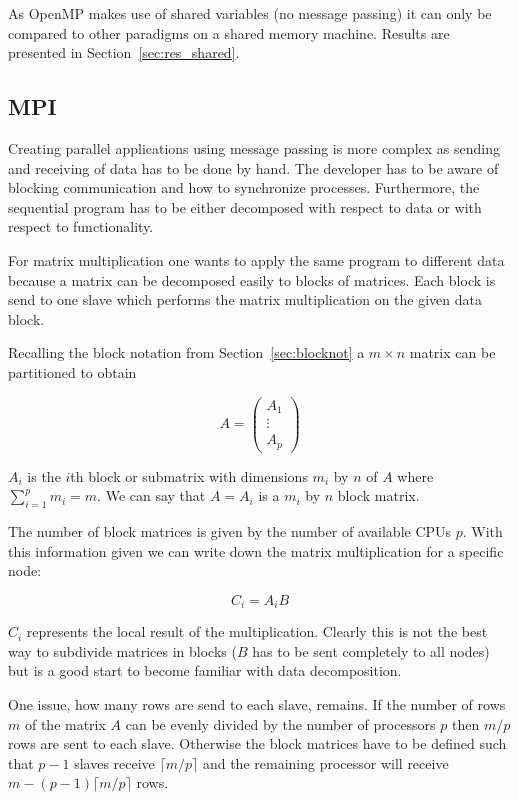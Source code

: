 As OpenMP makes use of shared variables (no message passing) it can
only be compared to other paradigms on a shared memory
machine. Results are presented in Section~\ref{sec:res_shared}.

\subsection{MPI}
\label{sec:mmMPI}

Creating parallel applications using message passing is more
complex as sending and receiving of data has to be done by hand. The
developer has to be aware of blocking communication and how to
synchronize processes. Furthermore, the sequential program has to be
either decomposed with respect to data or with respect to
functionality.

For matrix multiplication one wants to apply the same
program to different data because a matrix can be decomposed
easily to blocks of matrices. Each block is send to one slave which
performs the matrix multiplication on the given data block.

Recalling the block notation from Section~\ref{sec:blocknot} a $m
\times n$ matrix can be partitioned to obtain

$$ A = \left( \begin{array}{ccc}
A_{1} \\
\vdots\\
A_{p}
\end{array} \right)
$$

$A_{i}$ is the $i$th block or submatrix with dimensions $m_i$ by
$n$ of $A$ where $\sum_{i=1}^p m_i = m$. 
We can say that $A = A_{i}$ is a $m_i$ by $n$ block
matrix. 

The number of block matrices is given by the number of available
CPUs $p$. With this information given we can write down the matrix
multiplication for a specific node:

$$ C_{i} = A_{i}B $$

$C_{i}$ represents the local result of the multiplication. Clearly
this is not the best way to subdivide matrices in blocks ($B$ has to
be sent completely to all nodes) but is a good start to become
familiar with data decomposition.

One issue, how many rows are send to each slave, remains. If the
number of rows $m$ of the matrix $A$ can be evenly divided by the number
of processors $p$ then $m/p$ rows are sent to each slave. Otherwise
the block matrices have to be defined such that 
$p - 1$ slaves receive $\lceil m/p \rceil$ and the remaining processor
will receive $m - (p - 1) \lceil m/p \rceil$ rows.

